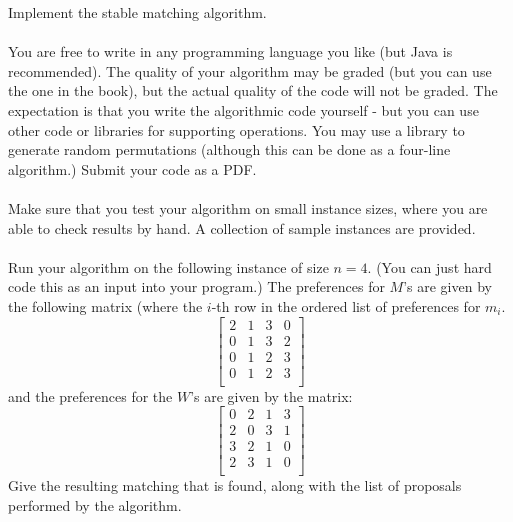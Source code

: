 Implement the stable matching algorithm. 
\\
\\
You are free to write in any programming language you like (but Java is recommended). The quality of your algorithm may be graded (but you can use the one in the book), but the actual quality of the code will not be graded. The expectation is that you write the algorithmic code yourself - but you can use other code or libraries for supporting operations. You may use a library to generate random permutations (although this can be done as a four-line algorithm.)  Submit your code as a PDF.
\\
\\
Make sure that you test your algorithm on small instance sizes, where you are able to check results by hand.  A collection of sample instances are provided.
\\
\\
Run your algorithm on the following instance of size $n=4$.  (You can just hard code this as an input into your program.)   The preferences for $M$'s are given by the following matrix (where the $i$-th row in the ordered list of preferences for $m_i$.
$$
\begin{bmatrix}
2& 1& 3& 0\\
0& 1& 3& 2\\
0& 1& 2& 3\\
0& 1& 2& 3\\
\end{bmatrix}
$$
and the preferences for the $W$'s are given by the matrix: 
$$
\begin{bmatrix}
0& 2& 1& 3\\
2& 0& 3& 1\\
3& 2& 1& 0\\
2& 3& 1& 0\\
\end{bmatrix}
$$
Give the resulting matching that is found,  along with the list of proposals performed by the algorithm.





